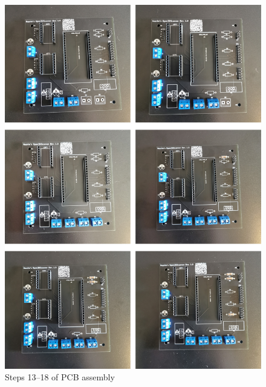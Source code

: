 \begin{figure}[ht!]%
	\begin{centered}%
		\includegraphics[width=\linewidth]{images/PcbSeries3.jpg}%
		\caption{Steps \numrange[text-rm=\lightBoldFont]{13}{18} of PCB assembly}%
	\end{centered}%
\end{figure}%

